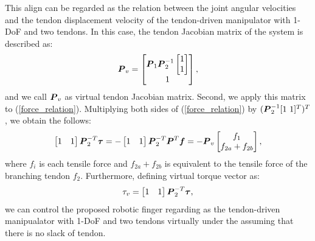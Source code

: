 \documentclass{llncs}
\def\vect#1{\mbox{\boldmath$#1$}}
\begin{document}
This align can be regarded as the relation between the joint angular velocities and the tendon displacement velocity of the tendon-driven manipulator with 1-DoF and two tendons.
In this case, the tendon Jacobian matrix of the system is described as:
\begin{align}
	\vect{P}_{v}=
	\begin{bmatrix}
	\vect{P}_{1}\vect{P}_{2}^{-1}
								\begin{bmatrix}
									1\\
									1
								\end{bmatrix}
									\\
	1
	\end{bmatrix},
\end{align}
and we call $\vect{P}_{v}$ as virtual tendon Jacobian matrix.
Second, we apply this matrix to (\ref{force_relation}).
Multiplying both sides of (\ref{force_relation}) by $(\vect{P}_{2}^{-1}[1\ 1]^{T})^{T}$, we obtain the follows:
\begin{align}
	\begin{bmatrix}
		1&1
	\end{bmatrix}
	\vect{P}_{2}^{-T}\vect{\tau}=-
	\begin{bmatrix}
		1&1
	\end{bmatrix}
	\vect{P}_{2}^{-T}\vect{P}^{T}\vect{f}=-\vect{P}_{v}
	\begin{bmatrix}
		f_{1}\\
		f_{2a}+f_{2b}
	\end{bmatrix},
\end{align}
where $f_{i}$ is each tensile force and $f_{2a}+f_{2b}$ is equivalent to the tensile force of the branching tendon $f_{2}$.
Furthermore, defining virtual torque vector as:
\begin{align}
	\tau_{v}=
	\begin{bmatrix}
		1&1
	\end{bmatrix}
	\vect{P}_{2}^{-T}\vect{\tau},
\end{align}
we can control the proposed robotic finger regarding as the tendon-driven manipualator with 1-DoF and two tendons virtually under the assuming that there is no slack of tendon.
\end{document}

